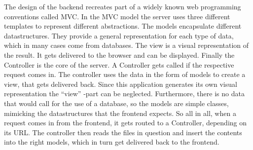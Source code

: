 The design of the backend recreates part of a widely known web programming conventions called MVC. In the MVC model the server uses three different templates to represent different abstractions. The models encapsulate different datastructures. They provide a general representation for each type of data, which in many cases come from databases. The view is a visual representation of the result. It gets delivered to the browser and can be displayed. Finally the Controller is the core of the server. A Controller gets called if the respective request comes in. The controller uses the data in the form of models to create a view, that gets delivered back. Since this application generates its own visual representation the ``view'' -part can be neglected. Furthermore, there is no data that would call for the use of a database, so the models are simple classes, mimicking the datastructures that the frontend expects. So all in all, when a request comes in from the frontend, it gets routed to a Controller, depending on its URL. The controller then reads the files in question and insert the contents into the right models, which in turn get delivered back to the frontend.

